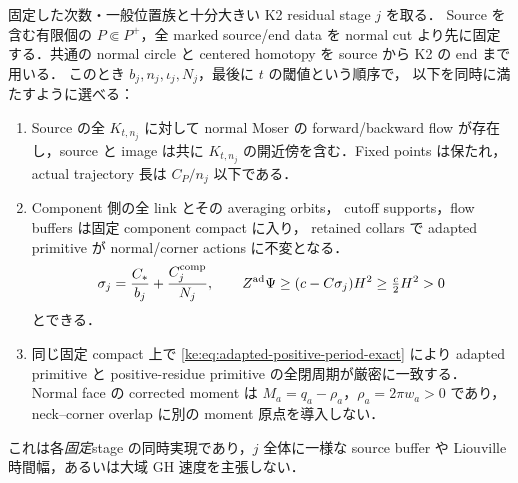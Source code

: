 \begin{proposition}
\label{ke:joint-source-component-buffer}
固定した次数・一般位置族と十分大きい K2 residual stage $j$ を取る．
Source を含む有限個の $P\Subset P^+$，全 marked source/end data を
normal cut より先に固定する．共通の normal circle と centered homotopy を
source から K2 の end まで用いる．
このとき $b_j,n_j,\iota_j,N_j$，最後に $t$ の閾値という順序で，
以下を同時に満たすように選べる：
\begin{enumerate}
\item Source の全 $K_{t,n_j}$ に対して normal Moser の
forward/backward flow が存在し，source と image は共に
$K_{t,n_j}$ の開近傍を含む．Fixed points は保たれ，
actual trajectory 長は $C_P/n_j$ 以下である．
\item Component 側の全 link とその averaging orbits，
cutoff supports，flow buffers は固定 component compact に入り，
retained collars で adapted primitive が normal/corner actions に不変となる．
\[
 \sigma_j=\frac{C_*}{b_j}+\frac{C_j^{\rm comp}}{N_j},\qquad
 Z^{\rm ad}\Psi\ge(c-C\sigma_j)H^2\ge\tfrac c2H^2>0
\]
とできる．
\item 同じ固定 compact 上で
\eqref{ke:eq:adapted-positive-period-exact} により adapted primitive と
positive-residue primitive の全閉周期が厳密に一致する．
Normal face の corrected moment は
$M_a=q_a-\rho_a$，$\rho_a=2\pi w_a>0$ であり，
neck--corner overlap に別の moment 原点を導入しない．
\end{enumerate}
これは各\emph{固定}stage の同時実現であり，$j$ 全体に一様な
source buffer や Liouville 時間幅，あるいは大域 GH 速度を主張しない．
\end{proposition}
